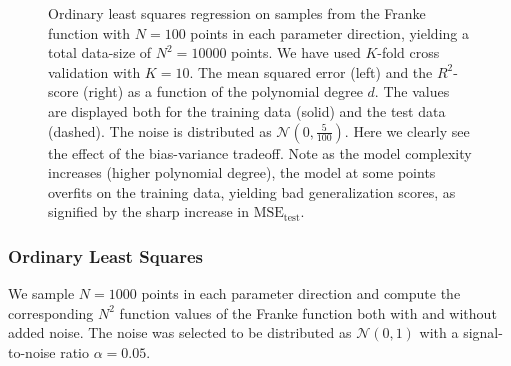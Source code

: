 \documentclass[dvipsnames, article, a4paper, oneside, 12pt]{memoir}
\newcommand{\N}{\mathcal{N}}
\begin{document}
\begin{figure}
    \centering
    \caption{Ordinary least squares regression on samples from the Franke
	    function with \( N = 100 \) points in each parameter direction,
	    yielding a total data-size of \( N^2 = 10000 \) points.  We have
	    used \( K \)-fold cross validation with \( K = 10 \).  The mean
	    squared error (left) and the \(R^2\)-score (right) as a function of
	    the polynomial degree \( d \). The values are displayed both for
	    the training data (solid) and the test data (dashed). The noise is
    distributed as \( \N(0, \tfrac{5}{100})\). Here we clearly see the effect
    of the bias-variance tradeoff. Note as the model complexity increases
    (higher polynomial degree), the model at some points overfits on the
    training data, yielding bad generalization scores, as signified by the
    sharp increase in \( \mathrm{MSE}_{\mathrm{test}} \).}
    \label{fig:ols_scores}
  \end{figure}

  \subsubsection{Ordinary Least Squares}
  
  We sample \( N = 1000 \) points in each parameter direction and compute the
  corresponding \( N^2 \) function values of the Franke function both with and
  without added noise. The noise was selected to be distributed as \( \N(0,
  1) \) with a signal-to-noise ratio \( \alpha = 0.05\).
  
\end{document}
